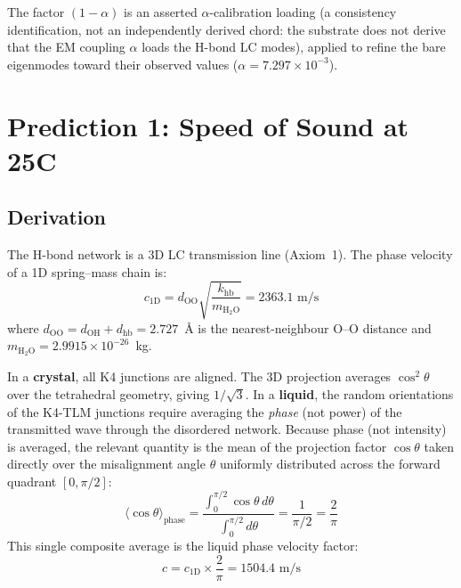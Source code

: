 The factor $(1-\alpha)$ is an asserted $\alpha$-calibration loading (a consistency identification, not an independently derived chord: the substrate does not derive that the EM coupling $\alpha$ loads the H-bond LC modes), applied to refine the bare eigenmodes toward their observed values ($\alpha = 7.297 \times 10^{-3}$).

\section{Prediction 1: Speed of Sound at 25\textdegree{}C}

\subsection{Derivation}

The H-bond network is a 3D LC transmission line (Axiom~1). The phase velocity of a 1D spring--mass chain is:
\begin{equation}
    c_\mathrm{1D} = d_\mathrm{OO} \sqrt{\frac{k_\mathrm{hb}}{m_\mathrm{H_2O}}} = 2363.1 \text{ m/s}
\end{equation}
where $d_\mathrm{OO} = d_\mathrm{OH} + d_\mathrm{hb} = 2.727$~\AA{} is the nearest-neighbour O--O distance and $m_\mathrm{H_2O} = 2.9915 \times 10^{-26}$~kg.

In a \textbf{crystal}, all K4 junctions are aligned. The 3D projection averages $\cos^2\theta$ over the tetrahedral geometry, giving $1/\sqrt{3}$. In a \textbf{liquid}, the random orientations of the K4-TLM junctions require averaging the \emph{phase} (not power) of the transmitted wave through the disordered network. Because phase (not intensity) is averaged, the relevant quantity is the mean of the projection factor $\cos\theta$ taken directly over the misalignment angle $\theta$ uniformly distributed across the forward quadrant $[0,\pi/2]$:
\begin{equation}
    \langle \cos\theta \rangle_\mathrm{phase}
    = \frac{\int_0^{\pi/2} \cos\theta\, d\theta}{\int_0^{\pi/2} d\theta}
    = \frac{1}{\pi/2}
    = \frac{2}{\pi}
\end{equation}
This single composite average is the liquid phase velocity factor:
\begin{equation}
\boxed{
    c = c_\mathrm{1D} \times \frac{2}{\pi} = 1504.4 \text{ m/s}
}
\end{equation}

